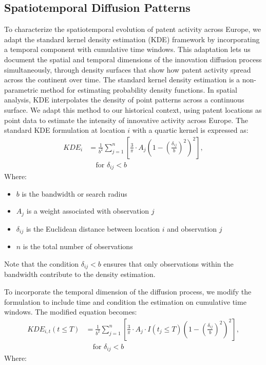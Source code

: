 \documentclass[letterpaper,12pt,leqno]{article}
\begin{document}
\subsection{Spatiotemporal Diffusion Patterns}
\label{sec:kde}
To characterize the spatiotemporal evolution of patent activity across Europe, we adapt the standard kernel density estimation (KDE) framework by incorporating a temporal component with cumulative time windows. This adaptation lets us document the spatial and temporal dimensions of the innovation diffusion process simultaneously, through density surfaces that show how patent activity spread across the continent over time.
The standard kernel density estimation is a non-parametric method for estimating probability density functions. In spatial analysis, KDE interpolates the density of point patterns across a continuous surface. We adapt this method to our historical context, using patent locations as point data to estimate the intensity of innovative activity across Europe.
The standard KDE formulation at location \(i\) with a quartic kernel is expressed as:
\begin{equation*}
  \begin{aligned}
    KDE_i &= \frac{1}{b^2} \sum_{j=1}^n \left[\frac{3}{\pi} \cdot A_j \left(1-\left(\frac{\delta_{ij}}{b}\right)^2\right)^2\right], \\
    &\quad \text{for } \delta_{ij} < b
  \end{aligned}
\end{equation*}
Where:
\begin{itemize}
  \item \(b\) is the bandwidth or search radius
  \item \(A_j\) is a weight associated with observation \(j\)
  \item \(\delta_{ij}\) is the Euclidean distance between location \(i\) and observation \(j\)
  \item \(n\) is the total number of observations
\end{itemize}
Note that the condition \(\delta_{ij} < b\) ensures that only observations within the bandwidth contribute to the density estimation.

To incorporate the temporal dimension of the diffusion process, we modify the formulation to include time and condition the estimation on cumulative time windows. The modified equation becomes:
\begin{equation}
  \label{eq:spatiotemporal}
  \begin{aligned}
    KDE_{i,t}(t \leq T) &= \frac{1}{b^2} \sum_{j=1}^n \left[\frac{3}{\pi} \cdot A_j \cdot I(t_j \leq T) \left(1-\left(\frac{\delta_{ij}}{b}\right)^2\right)^2\right], \\
    &\quad \text{for } \delta_{ij} < b
  \end{aligned}
\end{equation}
Where:
\end{document}
